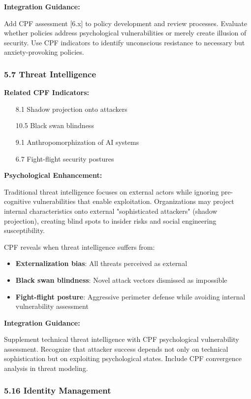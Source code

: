 \documentclass[11pt,a4paper]{article}
\begin{document}
\textbf{Integration Guidance:}

Add CPF assessment [6.x] to policy development and review processes. Evaluate whether policies address psychological vulnerabilities or merely create illusion of security. Use CPF indicators to identify unconscious resistance to necessary but anxiety-provoking policies.

\subsubsection{5.7 Threat Intelligence}

\textbf{Related CPF Indicators:}
\begin{itemize}
\item [8.1] Shadow projection onto attackers
\item [10.5] Black swan blindness
\item [9.1] Anthropomorphization of AI systems
\item [6.7] Fight-flight security postures
\end{itemize}

\textbf{Psychological Enhancement:}

Traditional threat intelligence focuses on external actors while ignoring pre-cognitive vulnerabilities that enable exploitation. Organizations may project internal characteristics onto external "sophisticated attackers" (shadow projection), creating blind spots to insider risks and social engineering susceptibility.

CPF reveals when threat intelligence suffers from:
\begin{itemize}
\item \textbf{Externalization bias}: All threats perceived as external
\item \textbf{Black swan blindness}: Novel attack vectors dismissed as impossible
\item \textbf{Fight-flight posture}: Aggressive perimeter defense while avoiding internal vulnerability assessment
\end{itemize}

\textbf{Integration Guidance:}

Supplement technical threat intelligence with CPF psychological vulnerability assessment. Recognize that attacker success depends not only on technical sophistication but on exploiting psychological states. Include CPF convergence analysis in threat modeling.

\subsubsection{5.16 Identity Management}
\end{document}

